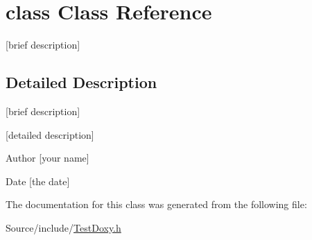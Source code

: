 \hypertarget{classclass}{\section{class Class Reference}
\label{classclass}
}


\mbox{[}brief description\mbox{]}  




\subsection{Detailed Description}
\mbox{[}brief description\mbox{]} 

\mbox{[}detailed description\mbox{]}

\begin{DoxyAuthor}{Author}
\mbox{[}your name\mbox{]} 
\end{DoxyAuthor}
\begin{DoxyDate}{Date}
\mbox{[}the date\mbox{]} 
\end{DoxyDate}


The documentation for this class was generated from the following file\-:\begin{DoxyCompactItemize}
\item 
Source/include/\hyperlink{_test_doxy_8h}{Test\-Doxy.\-h}\end{DoxyCompactItemize}
